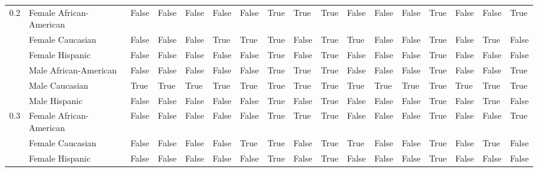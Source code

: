 \begin{tabular}{lllllllllllllllll}
0.2 & Female African-American &         False &                False &                  False &       False &           False &              True &        True &        True &       False &               False &          False &           True &       False &       False &        True \\
    & Female Caucasian &         False &                False &                  False &        True &            True &              True &       False &        True &        True &               False &          False &           True &       False &        True &       False \\
    & Female Hispanic &         False &                False &                  False &       False &           False &              True &       False &        True &       False &               False &          False &           True &       False &       False &       False \\
    & Male African-American &         False &                False &                  False &       False &           False &              True &        True &        True &       False &               False &          False &           True &       False &       False &        True \\
    & Male Caucasian &          True &                 True &                   True &        True &            True &              True &        True &        True &        True &                True &           True &           True &        True &        True &        True \\
    & Male Hispanic &         False &                False &                  False &       False &           False &              True &       False &        True &       False &               False &          False &           True &       False &        True &       False \\
0.3 & Female African-American &         False &                False &                  False &       False &           False &              True &        True &        True &       False &               False &          False &           True &       False &       False &        True \\
    & Female Caucasian &         False &                False &                  False &       False &            True &              True &       False &        True &        True &               False &          False &           True &       False &        True &       False \\
    & Female Hispanic &         False &                False &                  False &       False &           False &              True &       False &        True &       False &               False &          False &           True &       False &       False &       False \\

\end{tabular}
